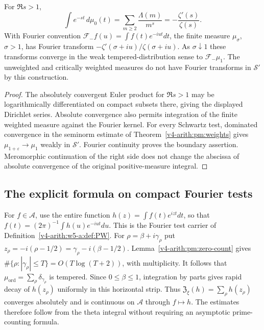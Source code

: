 \begin{proposition}
\label{v4-arith:pm:laplace}
For $\Re s>1$,
\[
 \int e^{-st}\,d\mu_0(t)
 =\sum_{m\geq2}\frac{\Lambda(m)}{m^s}
 =-\frac{\zeta'(s)}{\zeta(s)}.
\]
With Fourier convention $\mathcal F_-f(u)=\int f(t)e^{-iut}dt$,
the finite measure $\mu_\sigma$, $\sigma>1$, has Fourier transform
$-\zeta'(\sigma+iu)/\zeta(\sigma+iu)$.
As $\sigma\downarrow1$ these transforms converge in the weak
tempered-distribution sense to $\mathcal F_-\mu_1$.
The unweighted and critically weighted measures do not have Fourier
transforms in $\mathscr S'$ by this construction.
\end{proposition}
\begin{proof}
The absolutely convergent Euler product for $\Re s>1$ may be
logarithmically differentiated on compact subsets there, giving
the displayed Dirichlet series. Absolute convergence also permits
integration of the finite weighted measure against the Fourier
kernel. For every Schwartz test, dominated convergence in the
seminorm estimate of Theorem~\ref{v4-arith:pm:weights} gives
$\mu_{1+\varepsilon}\to\mu_1$ weakly in $\mathscr S'$.
Fourier continuity proves the boundary assertion. Meromorphic
continuation of the right side does not change the abscissa of
absolute convergence of the original positive-measure integral.
\end{proof}

\subsection{The explicit formula on compact Fourier tests}
\label{v4-arith:pm:explicit-section}

For $f\in\mathscr A$, use the entire function
$h(z)=\int f(t)e^{izt}dt$, so that
$f(t)=(2\pi)^{-1}\int h(u)e^{-iut}du$.
This is the Fourier test carrier of
Definition~\ref{v4-arith:w5-a:def:PW}.
For $\rho=\beta+i\gamma_\rho$ put
$z_\rho=-i(\rho-1/2)=\gamma_\rho-i(\beta-1/2)$.
Lemma~\ref{v4-arith:pm:zero-count} gives
$\#\{\rho:|\gamma_\rho|\leq T\}=O(T\log(T+2))$, with multiplicity.
It follows that $\mu_{\mathrm{ord}}=\sum_\rho\delta_{\gamma_\rho}$
is tempered. Since $0\leq\beta\leq1$, integration by parts gives rapid
decay of $h(z_\rho)$ uniformly in this horizontal strip.
Thus $\mathfrak Z_\xi(h)=\sum_\rho h(z_\rho)$ converges absolutely
and is continuous on $\mathscr A$ through $f\mapsto h$.
The estimates therefore follow from the theta integral without
requiring an asymptotic prime-counting formula.

